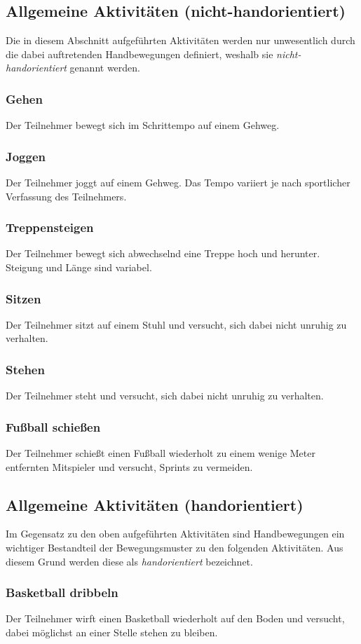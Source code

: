 \subsection*{Allgemeine Aktivitäten (nicht-handorientiert)}
Die in diesem Abschnitt aufgeführten Aktivitäten werden nur unwesentlich durch die dabei auftretenden Handbewegungen definiert, weshalb sie \textit{nicht-handorientiert} genannt werden.
\subsubsection{Gehen}
Der Teilnehmer bewegt sich im Schrittempo auf einem Gehweg.
\subsubsection{Joggen}
Der Teilnehmer joggt auf einem Gehweg. Das Tempo variiert je nach sportlicher Verfassung des Teilnehmers.
\subsubsection{Treppensteigen}
Der Teilnehmer bewegt sich abwechselnd eine Treppe hoch und herunter. Steigung und Länge sind variabel.
\subsubsection{Sitzen}
Der Teilnehmer sitzt auf einem Stuhl und versucht, sich dabei nicht unruhig zu verhalten.
\subsubsection{Stehen}
Der Teilnehmer steht und versucht, sich dabei nicht unruhig zu verhalten.
\subsubsection{Fußball schießen}
Der Teilnehmer schießt einen Fußball wiederholt zu einem wenige Meter entfernten Mitspieler und versucht, Sprints zu vermeiden.

\subsection*{Allgemeine Aktivitäten (handorientiert)}
Im Gegensatz zu den oben aufgeführten Aktivitäten sind Handbewegungen ein wichtiger Bestandteil der Bewegungsmuster zu den folgenden Aktivitäten. Aus diesem Grund werden diese als \textit{handorientiert} bezeichnet.
\subsubsection{Basketball dribbeln}
Der Teilnehmer wirft einen Basketball wiederholt auf den Boden und versucht, dabei möglichst an einer Stelle stehen zu bleiben.
